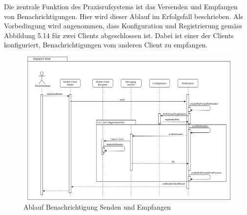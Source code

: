 Die zentrale Funktion des Praxisrufsystems ist das Versenden und Empfangen von Benachrichtigungen.
Hier wird dieser Ablauf im Erfolgsfall beschrieben.
Als Vorbedingung wird angenommen, dass Konfiguration und Registrierung gemäss Abbildung 5.14 für zwei Clients abgeschlossen ist.
Dabei ist einer der Clients konfiguriert, Benachrichtigungen vom anderen Client zu empfangen.

\begin{figure}[h]
    \centering
    \begin{minipage}[b]{0.9\textwidth}
        \includegraphics[width=\textwidth]{graphics/Sequence_Notification_Send}
        \caption{Ablauf Benachrichtigung Senden und Empfangen}
    \end{minipage}
\end{figure}

